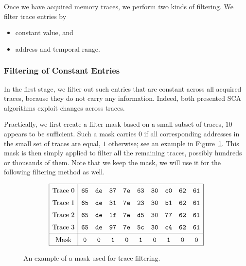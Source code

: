 Once we have acquired memory traces, we perform two kinds of filtering. We filter trace entries by
\begin{itemize}
	\item constant value, and
	\item address and temporal range.
\end{itemize}

\subsubsection{Filtering of Constant Entries}
	
	In the first stage, we filter out such entries that are constant across all acquired traces, because they do not carry any information. Indeed, both presented SCA algorithms exploit changes across traces.
	
	Practically, we first create a filter mask based on a small subset of traces, $10$ appears to be sufficient. Such a mask carries $0$ if all corresponding addresses in the small set of traces are equal, $1$ otherwise; see an example in Figure~\ref{fig:constmask}. This mask is then simply applied to filter all the remaining traces, possibly hundreds or thousands of them. Note that we keep the mask, we will use it for the following filtering method as well.
	
	\begin{figure}[H]
	\[
	\arraycolsep=.5em\def\arraystretch{1.5}
		\begin{array}{|c|ccccccccc|}
			\hline
			\textnormal{Trace 0} & {\tt 65} & {\tt de} & {\tt 37} & {\tt 7e} & {\tt 63} & {\tt 30} & {\tt c0} & {\tt 62} & {\tt 61} \\
			\textnormal{Trace 1} & {\tt 65} & {\tt de} & {\tt 31} & {\tt 7e} & {\tt 23} & {\tt 30} & {\tt b1} & {\tt 62} & {\tt 61} \\
			\textnormal{Trace 2} & {\tt 65} & {\tt de} & {\tt 1f} & {\tt 7e} & {\tt d5} & {\tt 30} & {\tt 77} & {\tt 62} & {\tt 61} \\
			\textnormal{Trace 3} & {\tt 65} & {\tt de} & {\tt 97} & {\tt 7e} & {\tt 5c} & {\tt 30} & {\tt c4} & {\tt 62} & {\tt 61} \\
			\hline
			\textnormal{Mask}    & {\tt 0}  & {\tt 0}  & {\tt 1}  & {\tt 0}  & {\tt 1}  & {\tt 0}  & {\tt 1}  & {\tt 0}  & {\tt 0} \\
			\hline
		\end{array}
	\]
	\caption{An example of a mask used for trace filtering.}
	\label{fig:constmask}
	\end{figure}
	
